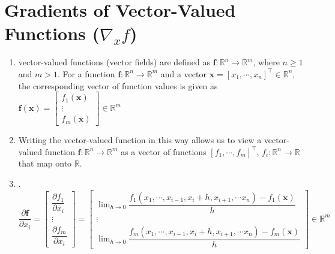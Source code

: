 





\section{Gradients of Vector-Valued Functions ($\nabla_x f$)}

\begin{enumerate}
    \item 
    \begin{definition}
        vector-valued functions (vector fields) are defined as $\bm{f} : \mathbb{R}^n \to \mathbb{R}^m$, where $n \geq 1$ and $m > 1$.
        For a function $\bm{f} : \mathbb{R}^n \to \mathbb{R}^m$ and a vector $\bm{x} = [x_1, \cdots , x_n]^\top \in \mathbb{R}^n$, the corresponding vector of function values is given as
        $
            \bm{f}(\bm{x})
            = \begin{bmatrix}
                f_1(\bm{x}) \\
                \vdots \\
                f_m(\bm{x})
            \end{bmatrix}
            \in \mathbb{R}^m
        $
        \hfill \cite{mfml/book/mml/Deisenroth-Faisal-Ong}
    \end{definition}

    \item Writing the vector-valued function in this way allows us to view a vector-valued function $\bm{f} : \mathbb{R}^n \to \mathbb{R}^m$ as a vector of functions $[f_1, \cdots , f_m]^\top$, $f_i : \mathbb{R}^n \to \mathbb{R}$ that map onto $\mathbb{R}$. 
    \hfill \cite{mfml/book/mml/Deisenroth-Faisal-Ong}

    \item 
    .\hfill
    ${
        \displaystyle
        \dfrac{\partial\bm{f}}{\partial x_i}
        = \begin{bmatrix}
            \dfrac{\partial f_1}{\partial x_i} \\
            \vdots \\
            \dfrac{\partial f_m}{\partial x_i}
        \end{bmatrix}
        = \begin{bmatrix}
            \lim_{h \to 0} \dfrac{f_1(x_1,\cdots,x_{i-1},x_i+h,x_{i+1},\cdots x_n)-f_1(\bm{x})}{h} \\
            \vdots \\
            \lim_{h \to 0} \dfrac{f_m(x_1,\cdots,x_{i-1},x_i+h,x_{i+1},\cdots x_n)-f_m(\bm{x})}{h}
        \end{bmatrix}
        \in \mathbb{R}^m
    }$
    \hfill \cite{mfml/book/mml/Deisenroth-Faisal-Ong}


\end{enumerate}
